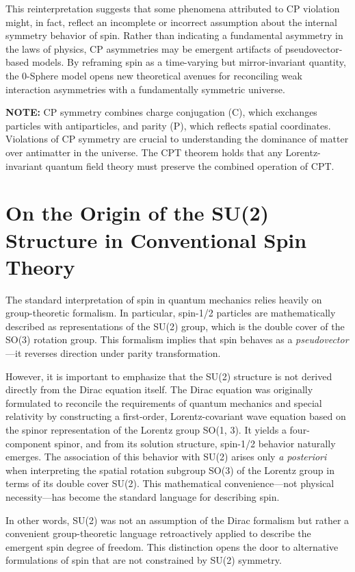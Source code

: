 \documentclass[12pt,letterpaper]{article} %
\begin{document}
This reinterpretation suggests that some phenomena attributed to CP violation might, in fact, reflect an incomplete or incorrect assumption about the internal symmetry behavior of spin. Rather than indicating a fundamental asymmetry in the laws of physics, CP asymmetries may be emergent artifacts of pseudovector-based models. By reframing spin as a time-varying but mirror-invariant quantity, the 0-Sphere model opens new theoretical avenues for reconciling weak interaction asymmetries with a fundamentally symmetric universe.

\medskip
\noindent\textbf{NOTE:} CP symmetry combines charge conjugation (C), which exchanges particles with antiparticles, and parity (P), which reflects spatial coordinates. Violations of CP symmetry are crucial to understanding the dominance of matter over antimatter in the universe. The CPT theorem holds that any Lorentz-invariant quantum field theory must preserve the combined operation of CPT.


\section{On the Origin of the {SU(2)} Structure in Conventional Spin Theory}

The standard interpretation of spin in quantum mechanics relies heavily on group-theoretic formalism. In particular, spin-1/2 particles are mathematically described as representations of the SU(2) group, which is the double cover of the SO(3) rotation group. This formalism implies that spin behaves as a \textit{pseudovector}—it reverses direction under parity transformation.

However, it is important to emphasize that the SU(2) structure is not derived directly from the Dirac equation itself. The Dirac equation was originally formulated to reconcile the requirements of quantum mechanics and special relativity by constructing a first-order, Lorentz-covariant wave equation based on the spinor representation of the Lorentz group SO(1, 3). It yields a four-component spinor, and from its solution structure, spin-1/2 behavior naturally emerges. The association of this behavior with SU(2) arises only \textit{a posteriori} when interpreting the spatial rotation subgroup SO(3) of the Lorentz group in terms of its double cover SU(2). This mathematical convenience—not physical necessity—has become the standard language for describing spin.

In other words, SU(2) was not an assumption of the Dirac formalism but rather a convenient group-theoretic language retroactively applied to describe the emergent spin degree of freedom. This distinction opens the door to alternative formulations of spin that are not constrained by SU(2) symmetry.
\end{document}
